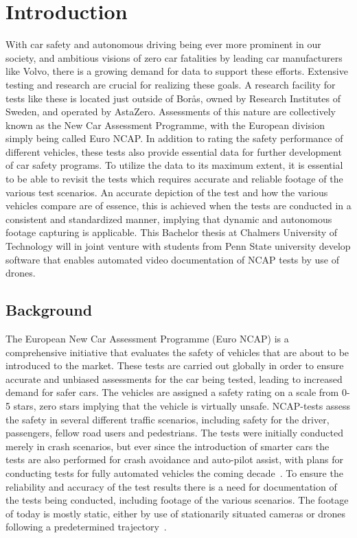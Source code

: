 \chapter{Introduction} \label{Introduction}

With car safety and autonomous driving being ever more prominent in our society, and ambitious visions of zero car fatalities by leading car manufacturers like Volvo, there is a growing demand for data to support these efforts. Extensive testing and research are crucial for realizing these goals. A research facility for tests like these is located just outside of Borås, owned by Research Institutes of Sweden, and operated by AstaZero. Assessments of this nature are collectively known as the New Car Assessment Programme, with the European division simply being called Euro NCAP. In addition to rating the safety performance of different vehicles, these tests also provide essential data for further development of car safety programs. To utilize the data to its maximum extent, it is essential to be able to revisit the tests which requires accurate and reliable footage of the various test scenarios. An accurate depiction of the test and how the various vehicles compare are of essence, this is achieved when the tests are conducted in a consistent and standardized manner, implying that dynamic and autonomous footage capturing is applicable. This Bachelor thesis at Chalmers University of Technology will in joint venture with students from Penn State university develop software that enables automated video documentation of NCAP tests by use of drones. 

\section{Background} \label{Background}
The European New Car Assessment Programme (Euro NCAP) is a comprehensive initiative that evaluates the safety of vehicles that are about to be introduced to the market. These tests are carried out globally in order to ensure accurate and unbiased assessments for the car being tested, leading to increased demand for safer cars. The vehicles are assigned a safety rating on a scale from 0-5 stars, zero stars implying that the vehicle is virtually unsafe. NCAP-tests assess the safety in several different traffic scenarios, including safety for the driver, passengers, fellow road users and pedestrians. The tests were initially conducted merely in crash scenarios, but ever since the introduction of smarter cars the tests are also performed for crash avoidance and auto-pilot assist, with plans for conducting tests for fully automated vehicles the coming decade~\cite{EuroNCAP2022EuroMobility}. 
\bigskip
\newline
To ensure the reliability and accuracy of the test results there is a need for documentation of the tests being conducted, including footage of the various scenarios. The footage of today is mostly static, either by use of stationarily situated cameras or drones following a predetermined trajectory~\cite{EuroNCAP2021EUROPEANPROTOCOL}. 
\bigskip
\newline

